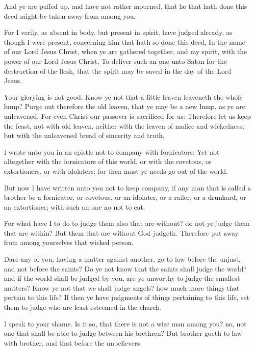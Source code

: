 \Verse And ye are puffed up, and have not rather mourned, that he that hath done this deed might be taken away from among you.

\Verse For I verily, as absent in body, but present in spirit, have judged already, as though I were present, concerning him that hath so done this deed, \Verse In the name of our Lord Jesus Christ, when ye are gathered together, and my spirit, with the power of our Lord Jesus Christ, \Verse To deliver such an one unto Satan for the destruction of the flesh, that the spirit may be saved in the day of the Lord Jesus.

\Verse Your glorying is not good. Know ye not that a little leaven leaveneth the whole lump?  \Verse Purge out therefore the old leaven, that ye may be a new lump, as ye are unleavened. For even Christ our passover is sacrificed for us: \Verse Therefore let us keep the feast, not with old leaven, neither with the leaven of malice and wickedness; but with the unleavened bread of sincerity and truth.

\Verse I wrote unto you in an epistle not to company with fornicators: \Verse Yet not altogether with the fornicators of this world, or with the covetous, or extortioners, or with idolaters; for then must ye needs go out of the world.

\Verse But now I have written unto you not to keep company, if any man that is called a brother be a fornicator, or covetous, or an idolater, or a railer, or a drunkard, or an extortioner; with such an one no not to eat.

\Verse For what have I to do to judge them also that are without? do not ye judge them that are within?  \Verse But them that are without God judgeth. Therefore put away from among yourselves that wicked person.


\Chapter
\Verse Dare any of you, having a matter against another, go to law before the unjust, and not before the saints?  \Verse Do ye not know that the saints shall judge the world? and if the world shall be judged by you, are ye unworthy to judge the smallest matters?  \Verse Know ye not that we shall judge angels? how much more things that pertain to this life?  \Verse If then ye have judgments of things pertaining to this life, set them to judge who are least esteemed in the church.

\Verse I speak to your shame. Is it so, that there is not a wise man among you? no, not one that shall be able to judge between his brethren?  \Verse But brother goeth to law with brother, and that before the unbelievers.

